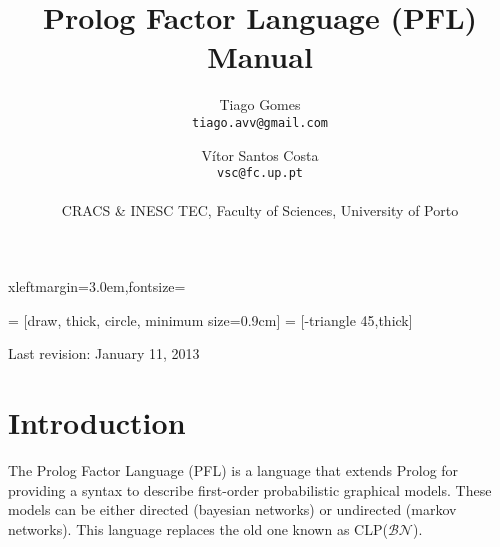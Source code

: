 \documentclass{article}
\begin{document}
 {xleftmargin=3.0em,fontsize=\small}

\newenvironment{pflcode}
  {\VerbatimEnvironment \setstretch{0.8} \begin{pflcodeve}}
  {\end{pflcodeve} }

\newcommand{\true}             {\mathtt{t}}
\newcommand{\false}            {\mathtt{f}}
\newcommand{\pathsep}          { $\triangleright$ }
\newcommand{\tableline}        {\noalign{\hrule height 0.8pt}}
\newcommand{\optionsection}[1] {\subsection*{\texttt{#1}}}

   = [draw, thick, circle, minimum size=0.9cm]
 = [-triangle 45,thick]

\setlength{\parskip}{\baselineskip}

\title{\Huge\textbf{Prolog Factor Language (PFL) Manual}}

\author{Tiago Gomes\\\texttt{tiago.avv@gmail.com} \and V\'{i}tor Santos Costa\\\texttt{vsc@fc.up.pt}\\\\
CRACS \& INESC TEC, Faculty of Sciences, University of Porto
}


\date{}

\maketitle
\thispagestyle{empty}
\vspace{5cm}
\begin{center}
  \large Last revision: January 11, 2013
\end{center}
\newpage



\section{Introduction}
The Prolog Factor Language (PFL) is a language that extends Prolog for providing a syntax to describe first-order probabilistic graphical models. These models can be either directed (bayesian networks) or undirected (markov networks). This language replaces the old one known as CLP($\mathcal{BN}$).
\end{document}
